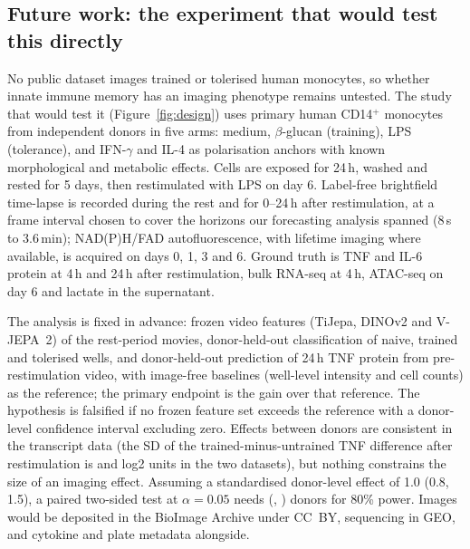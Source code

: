 \subsection{Future work: the experiment that would test this directly}
\label{sec:future}
No public dataset images trained or tolerised human monocytes, so whether innate immune
memory has an imaging phenotype remains untested. The study that would test it
(Figure~\ref{fig:design}) uses primary human CD14$^+$ monocytes from independent donors in
five arms: medium, $\beta$-glucan (training), LPS (tolerance), and IFN-$\gamma$ and IL-4 as
polarisation anchors with known morphological and metabolic effects. Cells are exposed for
24\,h, washed and rested for 5 days, then restimulated with LPS on day 6. Label-free
brightfield time-lapse is recorded during the rest and for 0--24\,h after restimulation, at a
frame interval chosen to cover the horizons our forecasting analysis spanned (8\,s to
3.6\,min); NAD(P)H/FAD autofluorescence, with lifetime imaging where available, is acquired
on days 0, 1, 3 and 6. Ground truth is TNF and IL-6 protein at 4\,h and 24\,h after
restimulation, bulk RNA-seq at 4\,h, ATAC-seq on day 6 and lactate in the supernatant.

The analysis is fixed in advance: frozen video features (TiJepa, DINOv2 and V-JEPA~2) of
the rest-period movies, donor-held-out classification of naive, trained and tolerised wells,
and donor-held-out prediction of 24\,h TNF protein from pre-restimulation video, with
image-free baselines (well-level intensity and cell counts) as the reference; the primary
endpoint is the gain over that reference. The hypothesis is falsified if no frozen feature set
exceeds the reference with a donor-level confidence interval excluding zero. Effects
between donors are consistent in the transcript data (the SD of the trained-minus-untrained
TNF difference after restimulation is  and  log2 units
in the two datasets), but nothing constrains the size of an imaging effect. Assuming a
standardised donor-level effect of 1.0 (0.8, 1.5), a paired two-sided test at
$\alpha = 0.05$ needs  (, ) donors for 80\%
power. Images would be deposited in the BioImage Archive under CC~BY, sequencing in GEO,
and cytokine and plate metadata alongside.
